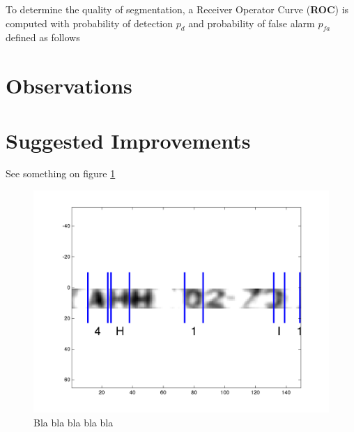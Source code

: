 \documentclass[a4paper,12pt]{article}
\begin{document}
To determine the quality of segmentation, a Receiver Operator Curve
(\textbf{ROC}) is computed with probability of detection $p_d$ and
probability of false alarm $p_{fa}$ defined as follows


\section{Observations}

\section{Suggested Improvements}


See something on figure \ref{fig:some-label}
\begin{figure}[htp]
\centering
\includegraphics[width=\linewidth]{pics/detection.png}
\caption{Bla bla bla bla bla} 
\label{fig:some-label}
\end{figure}
\end{document}
